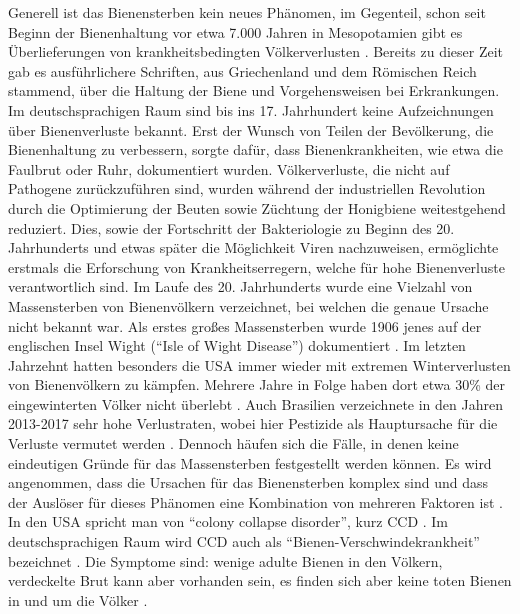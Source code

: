 Generell ist das Bienensterben kein neues Phänomen, im Gegenteil, schon seit Beginn der Bienenhaltung vor etwa 7.000 Jahren in Mesopotamien gibt es Überlieferungen von krankheitsbedingten Völkerverlusten \citep{flugel2015}. Bereits zu dieser Zeit gab es ausführlichere Schriften, aus Griechenland und dem Römischen Reich stammend, über die Haltung der Biene und Vorgehensweisen bei Erkrankungen. Im deutschsprachigen Raum sind bis ins 17. Jahrhundert keine Aufzeichnungen über Bienenverluste bekannt. Erst der Wunsch von Teilen der Bevölkerung, die Bienenhaltung zu verbessern, sorgte dafür, dass Bienenkrankheiten, wie etwa die Faulbrut oder Ruhr, dokumentiert wurden. Völkerverluste, die nicht auf Pathogene zurückzuführen sind, wurden während der industriellen Revolution durch die Optimierung der Beuten sowie Züchtung der Honigbiene weitestgehend reduziert. Dies, sowie der Fortschritt der Bakteriologie zu Beginn des 20. Jahrhunderts und etwas später die Möglichkeit Viren nachzuweisen, ermöglichte erstmals die Erforschung von Krankheitserregern, welche für hohe Bienenverluste verantwortlich sind. Im Laufe des 20. Jahrhunderts wurde eine Vielzahl von Massensterben von Bienenvölkern verzeichnet, bei welchen die genaue Ursache nicht bekannt war. Als erstes großes Massensterben wurde 1906 jenes auf der englischen Insel Wight (\enquote{Isle of Wight Disease}) dokumentiert \citep{neumann2009, flugel2015}.
\newline
Im letzten Jahrzehnt hatten besonders die USA immer wieder mit extremen Winterverlusten von Bienenvölkern zu kämpfen. Mehrere Jahre in Folge haben dort etwa 30\% der eingewinterten Völker nicht überlebt \citep{lee2015, steinhauer2014, vanengelsdorp2008, vanengelsdorp2007, vanengelsdorp2010, vanengelsdorp2011}. Auch Brasilien verzeichnete in den Jahren 2013-2017 sehr hohe Verlustraten, wobei hier Pestizide als Hauptursache für die Verluste vermutet werden \citep{castilhos2019}. Dennoch häufen sich die Fälle, in denen keine eindeutigen Gründe für das Massensterben festgestellt werden können. Es wird angenommen, dass die Ursachen für das Bienensterben komplex sind und dass der Auslöser für dieses Phänomen eine Kombination von mehreren Faktoren ist \citep{moritz2010, brodschneider2013, steinhauer2014, belsky2019}. In den USA spricht man von \enquote{colony collapse disorder}, kurz CCD \citep{vanengelsdorp2009, williams2010}. Im deutschsprachigen Raum wird CCD auch als \enquote{Bienen-Verschwindekrankheit} bezeichnet \citep{flugel2015}. Die Symptome sind: wenige adulte Bienen in den Völkern, verdeckelte Brut kann aber vorhanden sein, es finden sich aber keine toten Bienen in und um die Völker \citep{vanengelsdorp2009}.
